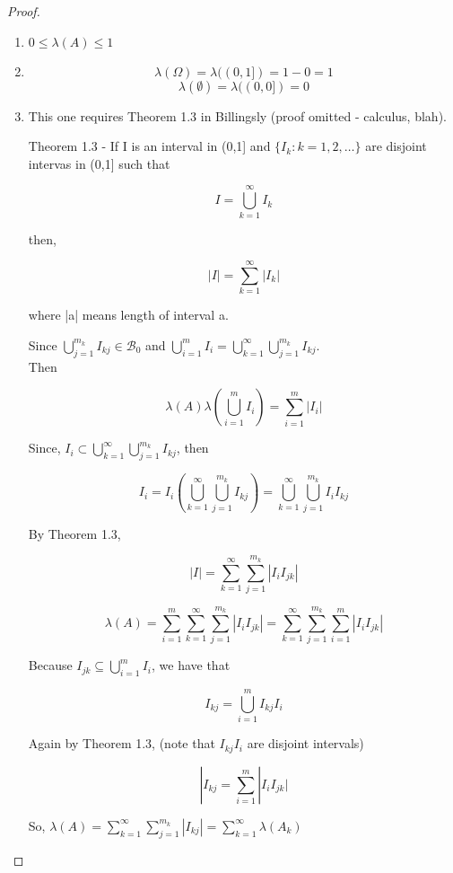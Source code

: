 \documentclass[11pt,fleqn]{book} %
\begin{document}
\begin{proof}
	\begin{enumerate}
		\item $0 \leq \lambda(A) \leq 1$

		\item $$\lambda(\Omega) = \lambda((0,1]) = 1-0 = 1$$
		$$\lambda(\emptyset) = \lambda((0,0]) = 0$$


		\item This one requires Theorem 1.3 in Billingsly (proof omitted - calculus, blah).

		Theorem 1.3 - If I is an interval in (0,1] and $\{I_k: k=1, 2, \dots \}$ are disjoint intervas in (0,1] such that 

		$$I = \bigcup^\infty_{k=1} I_k$$

		then, 

		$$|I| = \displaystyle \sum^\infty_{k=1} |I_k| $$

		where |a| means length of interval a. 

		Since $\bigcup^{m_k}_{j=1} I_{kj} \in \mathcal{B}_0$ and $\bigcup^{m}_{i=1} I_{i} = \bigcup^\infty_{k=1}\bigcup^{m_k}_{j=1} I_{kj}$.\\

		Then 

		$$\lambda(A) \lambda(\bigcup^{m}_{i=1} I_{i}) = \displaystyle \sum^m_{i=1} |I_i| $$

		Since, $I_i \subset \bigcup^\infty_{k=1}\bigcup^{m_k}_{j=1} I_{kj}$, then 

		$$I_i = I_i(\bigcup^\infty_{k=1}\bigcup^{m_k}_{j=1} I_{kj}) = \bigcup^\infty_{k=1}\bigcup^{m_k}_{j=1} I_i I_{kj} $$

		By Theorem 1.3, 

		$$|I| = \displaystyle \sum^\infty_{k=1} \sum^{m_k}_{j=1} |I_i I_{jk}| $$

		$$\lambda(A) = \displaystyle \sum^m_{i=1} \sum^\infty_{k=1} \sum^{m_k}_{j=1} |I_i I_{jk}| = \displaystyle  \sum^\infty_{k=1} \sum^{m_k}_{j=1} \sum^m_{i=1}|I_i I_{jk}| $$

		Because $I_{jk} \subseteq \bigcup^m_{i=1} I_i$, we have that

		$$I_{kj} = \bigcup^m_{i=1} I_{kj} I_i $$

		Again by Theorem 1.3, (note that $I_{kj} I_i$ are disjoint intervals)

		$$|I_{kj} = \sum^m_{i=1}|I_i I_{jk}| $$

		So, $\lambda(A) = \sum^\infty_{k=1} \sum^{m_k}_{j=1} | I_{kj} | = \sum^\infty_{k=1} \lambda(A_k)$


	\end{enumerate}


\end{proof}
\end{document}

